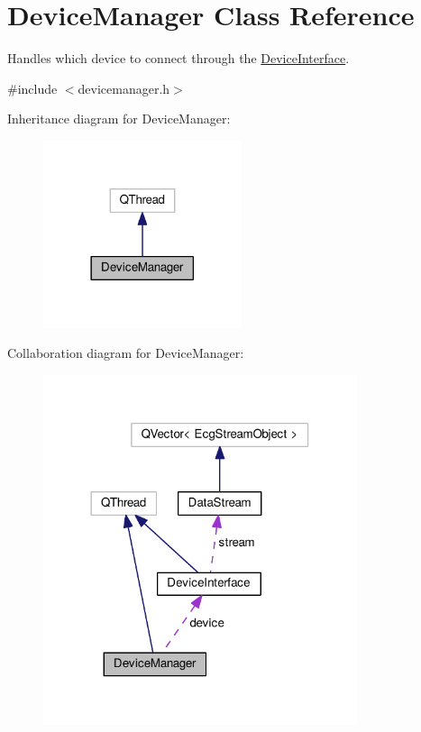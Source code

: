 \hypertarget{classDeviceManager}{}\section{Device\+Manager Class Reference}
\label{classDeviceManager}


Handles which device to connect through the \hyperlink{classDeviceInterface}{Device\+Interface}.  




{\ttfamily \#include $<$devicemanager.\+h$>$}



Inheritance diagram for Device\+Manager\+:
\nopagebreak
\begin{figure}[H]
\begin{center}
\leavevmode
\includegraphics[width=165pt]{classDeviceManager__inherit__graph}
\end{center}
\end{figure}


Collaboration diagram for Device\+Manager\+:
\nopagebreak
\begin{figure}[H]
\begin{center}
\leavevmode
\includegraphics[width=261pt]{classDeviceManager__coll__graph}
\end{center}
\end{figure}
